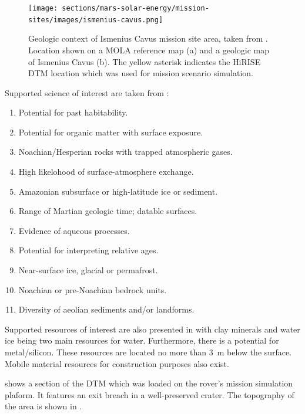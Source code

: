 \begin{figure}[h]
  \centering
  \hypersetup{linkcolor=captionTextColor}
  \texttt{[image: sections/mars-solar-energy/mission-sites/images/ismenius-cavus.png]}\\
  \caption[Geologic context of Ismenius Cavus mission site area]
          {Geologic context of Ismenius Cavus mission site area, taken from . Location shown on a \ac{MOLA} reference map (a) and a geologic map of Ismenius Cavus (b). The yellow asterisk indicates the \ac{HiRISE} \ac{DTM} location which was used for mission scenario simulation.}
  \label{fig:mission-site-ismenius-cavus}
\end{figure}


Supported science of interest are taken from :
\begin{enumerate}[label=\textcolor{BulletBlue}{(\alph*)}]
    \item Potential for past habitability.
    \item Potential for organic matter with surface exposure.
    \item Noachian/Hesperian rocks with trapped atmospheric gases.
    \item High likelohood of surface-atmosphere exchange.
    \item Amazonian subsurface or high-latitude ice or sediment.
    \item Range of Martian geologic time; datable surfaces.
    \item Evidence of aqueous processes.
    \item Potential for interpreting relative ages.
    \item Near-surface ice, glacial or permafrost.
    \item Noachian or pre-Noachian bedrock units.
    \item Diversity of aeolian sediments and/or landforms.
\end{enumerate}

Supported resources of interest are also presented in  with clay minerals and water ice being two main resources for water. Furthermore, there is a potential for metal/silicon. These resources are located no more than \SI{3}{\meter} below the surface. Mobile material resources for construction purposes also exist.

 shows a section of the \ac{DTM} which was loaded on the rover's mission simulation plaform. It features an exit breach in a well-preserved crater. The topography of the area is shown in .
\vspace{0.5cm}

